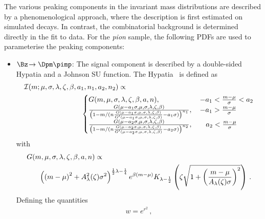 The various peaking components in the invariant mass distributions are described by a phenomenological approach, where the description is first
estimated on simulated decays.
In contrast, the combinatorial background is determined directly in the fit to data.
For the \emph{pion} sample, the following PDFs are used to parameterise the peaking components:
\begin{itemize}
	\item $\Bz\!\to\Dpm\pimp$: The signal component is described by a double-sided Hypatia and a Johnson SU function.
	The Hypatia~\cite{Santos:2013ky} is defined as
	\begin{equation}
	\begin{aligned}
	&\mathcal{I}(m;\mu,\sigma,\lambda,\zeta,\beta,a_1,n_1,a_2,n_2) \propto\\
	&\hspace{2.8cm}\begin{cases}
	G(m,\mu,\sigma,\lambda,\zeta,\beta,a,n), &\,   - a_1 < \frac{m - \mu}{\sigma} < a_2 \\
	\frac{G(\mu - a_1 \sigma,\mu,\sigma,\lambda,\zeta,\beta)}{\left(1 - m/(n \frac{G(\mu - a_1\sigma,\mu,\sigma,\lambda,\zeta,\beta)}{G^\prime(\mu - a_1 \sigma,\mu,\sigma,\lambda,\zeta,\beta)} -a_1 \sigma)\right)^{n_1}},	&\,  - a_1 > \frac{m - \mu}{\sigma} \\
	\frac{G(\mu - a_2 \sigma,\mu,\sigma,\lambda,\zeta,\beta)}{\left(1 - m/(n \frac{G(\mu - a_2\sigma,\mu,\sigma,\lambda,\zeta,\beta)}{G^\prime(\mu - a_2 \sigma,\mu,\sigma,\lambda,\zeta,\beta)} -a_2 \sigma)\right)^{n_2}},	&\quad a_2 < \frac{m - \mu}{\sigma} \\
	\end{cases}
	\label{eq:ipatia}
	\end{aligned}
	\end{equation}
	with
	\begin{equation}
	\begin{aligned}
	&G(m,\mu,\sigma,\lambda,\zeta,\beta,a,n)\propto\\
	&\hspace{0.6cm}\left(\left(m-\mu\right)^2+A_\lambda^2(\zeta)\sigma^2\right)^{\frac{1}{2}\lambda-\frac{1}{4}}e^{\beta\left(m-\mu\right)}K_{\lambda-\frac{1}{2}}\left(\zeta\sqrt{1+\left(\frac{m-\mu}{A_\lambda(\zeta)\sigma}\right)^2}\right)\,.
	\end{aligned}
	\end{equation}
	Defining the quantities
	\begin{align*}
	&w=e^{r^2}\,,&\\

\end{align*}
\end{itemize}
